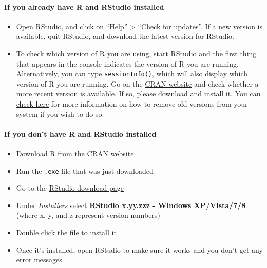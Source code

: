 \documentclass[
  12pt, krantz2,
]{krantz}
\newcommand{\passthrough}[1]{#1}
\providecommand{\tightlist}{%
  \setlength{\itemsep}{0pt}\setlength{\parskip}{0pt}}
\newcommand{\1}{\mathbbm{1}}
\theoremstyle{definition}
\theoremstyle{definition}
\theoremstyle{definition}
\theoremstyle{definition}
\theoremstyle{remark}
\begin{document}
\hypertarget{if-you-already-have-r-and-rstudio-installed}{%
\paragraph{If you already have R and RStudio installed}\label{if-you-already-have-r-and-rstudio-installed}}

\begin{itemize}
\tightlist
\item
  Open RStudio, and click on ``Help'' \textgreater{} ``Check for updates''. If a new version is
  available, quit RStudio, and download the latest version for RStudio.
\item
  To check which version of R you are using, start RStudio and the first thing
  that appears in the console indicates the version of R you are
  running. Alternatively, you can type \passthrough{\lstinline!sessionInfo()!}, which will also display
  which version of R you are running. Go on the \href{https://cran.r-project.org/bin/windows/base/}{CRAN
  website} and check whether a
  more recent version is available. If so, please download and install it. You
  can \href{https://cran.r-project.org/bin/windows/base/rw-FAQ.html\#How-do-I-UNinstall-R_003f}{check here}
  for more information on how to remove old versions from your system if you
  wish to do so.
\end{itemize}

\hypertarget{if-you-dont-have-r-and-rstudio-installed}{%
\paragraph{If you don't have R and RStudio installed}\label{if-you-dont-have-r-and-rstudio-installed}}

\begin{itemize}
\tightlist
\item
  Download R from
  the \href{http://cran.r-project.org/bin/windows/base/release.htm}{CRAN website}.
\item
  Run the \passthrough{\lstinline!.exe!} file that was just downloaded
\item
  Go to the \href{https://www.rstudio.com/products/rstudio/download/\#download}{RStudio download page}
\item
  Under \emph{Installers} select \textbf{RStudio x.yy.zzz - Windows
  XP/Vista/7/8} (where x, y, and z represent version numbers)
\item
  Double click the file to install it
\item
  Once it's installed, open RStudio to make sure it works and you don't get any
  error messages.
\end{itemize}
\end{document}
